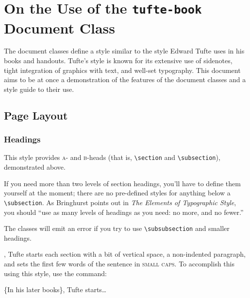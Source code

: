 \chapter[On the Use of the tufte-book Document Class]{On the Use of the \texttt{tufte-book} Document Class}
\label{ch:tufte-book}

The \TL document classes define a style similar to the
style Edward Tufte uses in his books and handouts.  Tufte's style is known
for its extensive use of sidenotes, tight integration of graphics with
text, and well-set typography.  This document aims to be at once a
demonstration of the features of the \TL document classes
and a style guide to their use.

\section{Page Layout}\label{sec:page-layout}
\subsection{Headings}\label{sec:headings}
This style provides \textsc{a}- and \textsc{b}-heads (that is,
\Verb|\section| and \Verb|\subsection|), demonstrated above.

If you need more than two levels of section headings, you'll have to define
them yourself at the moment; there are no pre-defined styles for anything below
a \Verb|\subsection|.  As Bringhurst points out in \textit{The Elements of
	Typographic Style},\cite{Bringhurst2005} you should ``use as many levels of
headings as you need: no more, and no fewer.''

The \TL classes will emit an error if you try to use
\linebreak\Verb|\subsubsection| and smaller headings.

,\cite{Tufte2006} Tufte
starts each section with a bit of vertical space, a non-indented paragraph,
and sets the first few words of the sentence in \textsc{small caps}.  To
accomplish this using this style, use the  command:
\begin{docspec}
	\{In his later books\}, Tufte starts\ldots
\end{docspec}


